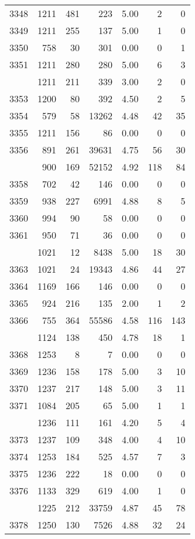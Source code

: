 \documentclass[
]{article}
\begin{document}
\begin{table}
\begin{tabular}[t]{lrrrrrr}
3348 & 1211 & 481 & 223 & 5.00 & 2 & 0\\
3349 & 1211 & 255 & 137 & 5.00 & 1 & 0\\
3350 & 758 & 30 & 301 & 0.00 & 0 & 1\\
3351 & 1211 & 280 & 280 & 5.00 & 6 & 3\\
\addlinespace
3352 & 1211 & 211 & 339 & 3.00 & 2 & 0\\
3353 & 1200 & 80 & 392 & 4.50 & 2 & 5\\
3354 & 579 & 58 & 13262 & 4.48 & 42 & 35\\
3355 & 1211 & 156 & 86 & 0.00 & 0 & 0\\
3356 & 891 & 261 & 39631 & 4.75 & 56 & 30\\
\addlinespace
3357 & 900 & 169 & 52152 & 4.92 & 118 & 84\\
3358 & 702 & 42 & 146 & 0.00 & 0 & 0\\
3359 & 938 & 227 & 6991 & 4.88 & 8 & 5\\
3360 & 994 & 90 & 58 & 0.00 & 0 & 0\\
3361 & 950 & 71 & 36 & 0.00 & 0 & 0\\
\addlinespace
3362 & 1021 & 12 & 8438 & 5.00 & 18 & 30\\
3363 & 1021 & 24 & 19343 & 4.86 & 44 & 27\\
3364 & 1169 & 166 & 146 & 0.00 & 0 & 0\\
3365 & 924 & 216 & 135 & 2.00 & 1 & 2\\
3366 & 755 & 364 & 55586 & 4.58 & 116 & 143\\
\addlinespace
3367 & 1124 & 138 & 450 & 4.78 & 18 & 1\\
3368 & 1253 & 8 & 7 & 0.00 & 0 & 0\\
3369 & 1236 & 158 & 178 & 5.00 & 3 & 10\\
3370 & 1237 & 217 & 148 & 5.00 & 3 & 11\\
3371 & 1084 & 205 & 65 & 5.00 & 1 & 1\\
\addlinespace
3372 & 1236 & 111 & 161 & 4.20 & 5 & 4\\
3373 & 1237 & 109 & 348 & 4.00 & 4 & 10\\
3374 & 1253 & 184 & 525 & 4.57 & 7 & 3\\
3375 & 1236 & 222 & 18 & 0.00 & 0 & 0\\
3376 & 1133 & 329 & 619 & 4.00 & 1 & 0\\
\addlinespace
3377 & 1225 & 212 & 33759 & 4.87 & 45 & 78\\
3378 & 1250 & 130 & 7526 & 4.88 & 32 & 24\\

\end{tabular}
\end{table}
\end{document}
